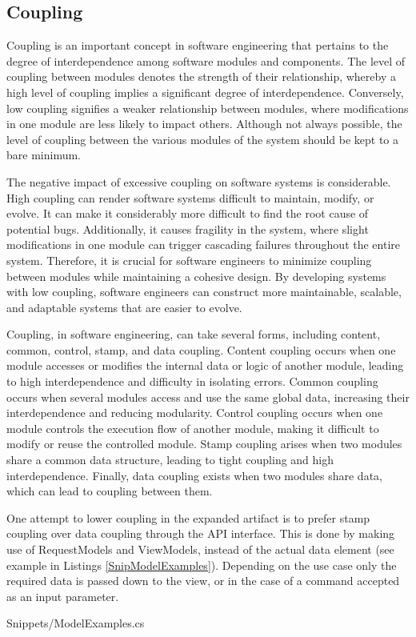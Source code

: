 \subsection{Coupling} \label{subsec:on_coupling}

Coupling is an important concept in software engineering that pertains to the degree of
interdependence among software modules and components. The level of coupling between
modules denotes the strength of their relationship, whereby a high level of coupling
implies a significant degree of interdependence. Conversely, low coupling signifies a
weaker relationship between modules, where modifications in one module are less likely to
impact others. Although not always possible, the level of coupling between the various
modules of the system should be kept to a bare minimum.

The negative impact of excessive coupling on software systems is considerable. High
coupling can render software systems difficult to maintain, modify, or evolve. It can make
it considerably more difficult to find the root cause of potential bugs. Additionally, it
causes fragility in the system, where slight modifications in one module can trigger
cascading failures throughout the entire system. Therefore, it is crucial for software
engineers to minimize coupling between modules while maintaining a cohesive design. By
developing systems with low coupling, software engineers can construct more maintainable,
scalable, and adaptable systems that are easier to evolve.

Coupling, in software engineering, can take several forms, including content, common,
control, stamp, and data coupling. Content coupling occurs when one module accesses or
modifies the internal data or logic of another module, leading to high interdependence and
difficulty in isolating errors. Common coupling occurs when several modules access and use
the same global data, increasing their interdependence and reducing modularity. Control
coupling occurs when one module controls the execution flow of another module, making it
difficult to modify or reuse the controlled module. Stamp coupling arises when two modules
share a common data structure, leading to tight coupling and high interdependence.
Finally, data coupling exists when two modules share data, which can lead to coupling
between them.

One attempt to lower coupling in the expanded artifact is to prefer stamp coupling over
data coupling through the API interface. This is done by making use of RequestModels and
ViewModels, instead of the actual data element (see example in Listings \ref{SnipModelExamples}).
Depending on the use case only the required data is passed down to the view, or in the
case of a command accepted as an input parameter.


    {Snippets/ModelExamples.cs}